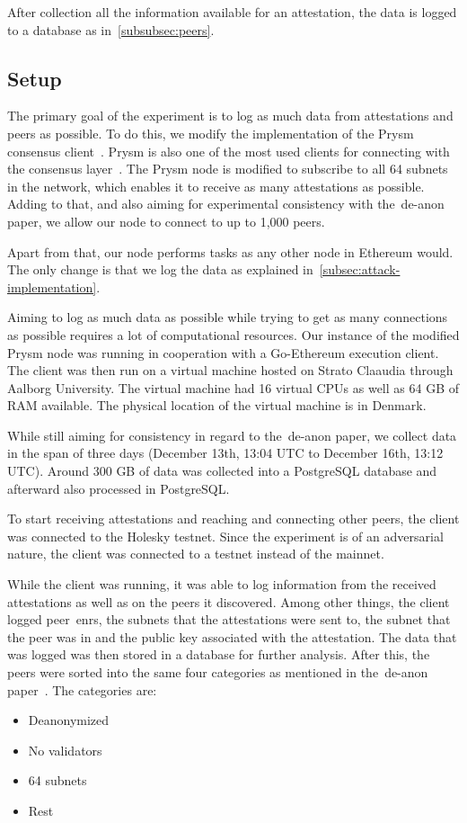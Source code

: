 After collection all the information available for an attestation,
the data is logged to a database as in~\autoref{subsubsec:peers}.

\subsection{Setup}\label{subsec:setup}
The primary goal of the experiment is to log as much data from attestations and peers as possible.
To do this, we modify the implementation of the Prysm consensus client~\cite{prysm}.
Prysm is also one of the most used clients for connecting with the consensus layer~\cite{client-diversity}.
The Prysm node is modified to subscribe to all 64 subnets in the network, which enables it to receive as many attestations as possible.
Adding to that, and also aiming for experimental consistency with the~\gls{de-anon paper}, we allow our node to connect to up to 1,000 peers.

Apart from that, our node performs tasks as any other node in Ethereum would.
The only change is that we log the data as explained in~\autoref{subsec:attack-implementation}.

Aiming to log as much data as possible while trying to get as many connections as possible requires a lot of computational resources.
Our instance of the modified Prysm node was running in cooperation with a Go-Ethereum execution client.
The client was then run on a virtual machine hosted on Strato Claaudia through Aalborg University.
The virtual machine had 16 virtual CPUs as well as 64 GB of RAM available.
The physical location of the virtual machine is in Denmark.

While still aiming for consistency in regard to the~\gls{de-anon paper}, we collect data in the span of three days (December 13th, 13:04 UTC to December 16th, 13:12 UTC).
Around 300 GB of data was collected into a PostgreSQL database and afterward also processed in PostgreSQL\@.


To start receiving attestations and reaching and connecting other peers,
the client was connected to the Holesky testnet.
Since the experiment is of an adversarial nature, the client was connected to a testnet instead of the mainnet.

While the client was running,
it was able to log information from the received attestations as well as on the peers it discovered.
Among other things, the client logged peer~\glspl{enr}, the subnets that the attestations were sent to,
the subnet that the peer was in and the public key associated with the attestation.
The data that was logged was then stored in a database for further analysis.
After this,
the peers were sorted into the same four categories
as mentioned in the~\gls{de-anon paper}~\cite{heimbach2024deanonymizingethereumvalidatorsp2p}.
The categories are:
\begin{itemize}
    \item Deanonymized
    \item No validators
    \item 64 subnets
    \item Rest
\end{itemize}

